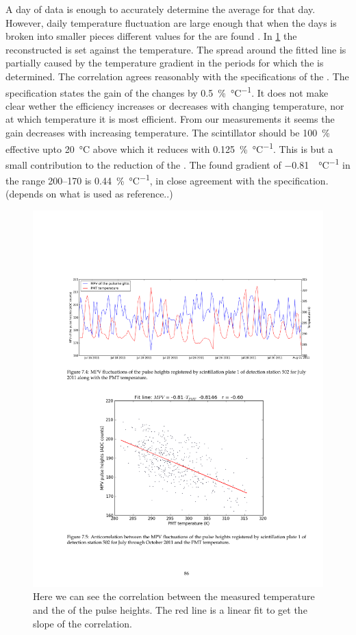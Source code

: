 A day of data is enough to accurately determine the average \mpv for that day. However, daily temperature fluctuation are large enough that when the days is broken into smaller pieces different values for the \mpv are found \cite{bartels2012mpv}. In \cref{fig:mpv_temperature} the reconstructed \mpv is set against the \pmt temperature. The spread around the fitted line is partially caused by the temperature gradient in the periods for which the \mpv is determined. The correlation agrees reasonably with the specifications of the \pmt. The specification states the gain of the \pmt changes by \SI{0.5}{\percent\per\degreeCelsius}. It does not make clear wether the efficiency increases or decreases with changing temperature, nor at which temperature it is most efficient. From our measurements it seems the gain decreases with increasing temperature. The scintillator should be \SI{100}{\percent} effective upto \SI{20}{\degreeCelsius} above which it reduces with \SI{0.125}{\percent\per\degreeCelsius}. This is but a small contribution to the reduction of the \mpv. The found gradient of \SI{-0.81}{\adc\per\degreeCelsius} in the range \SIrange{200}{170}{\adc} is \SI{0.44}{\percent\per\degreeCelsius}, in close agreement with the specification. (depends on what is used as reference..)

\begin{figure}
    \centering
    \includegraphics[width=.7\linewidth]{plots/station/mpv_temperature}
    \caption{Here we can see the correlation between the measured temperature and the \mpv of the pulse heights. The red line is a linear fit to get the slope of the correlation.}
    \label{fig:mpv_temperature}
\end{figure}

